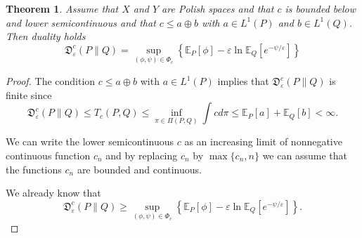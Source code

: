 \documentclass{amsart}
\newtheorem{theorem}{Theorem}[section]
\theoremstyle{definition}
\theoremstyle{remark}
\numberwithin{equation}{section}
\begin{document}
\begin{theorem}\label{thm:duality.general}
Assume that $X$ and $Y$ are Polish spaces and that $c$ is bounded below and lower semicontinuous and that $c \le a \oplus b$ with $a \in L^1(P)$ and $b \in L^1(Q)$.  Then duality holds 
\begin{equation}
\mathfrak{D}^c_\varepsilon(P\|Q) = \sup_{(\phi,\psi)\in \Phi_c} \left\{ \mathbb{E}_P[\phi] - \varepsilon\ln \mathbb{E}_Q[e^{-\psi/\varepsilon}] \right\}
\end{equation}
\end{theorem}

\begin{proof} The condition 
$c \le a \oplus b$ with $a \in L^1(P)$ implies that $\mathfrak{D}^c_\varepsilon(P\|Q)$ is finite since 
$$ 
\mathfrak{D}^c_\varepsilon(P\|Q) \le T_c(P,Q)
\le \inf_{\pi \in \Pi(P,Q)} \int c d\pi \le \mathbb{E}_P[a] + \mathbb{E}_Q[b] <\infty .
$$


We can write the lower semicontinuous $c$ as an increasing limit of nonnegative continuous function $c_n$ and by replacing $c_n$ by $\max\{c_n,n\}$ we can assume that the functions $c_n$ are bounded and continuous. 


We already know that
\begin{equation}
\mathfrak{D}^{c}_\varepsilon(P\|Q) \ge \sup_{(\phi,\psi)\in \Phi_{c}} \left\{ \mathbb{E}_P[\phi] - \varepsilon\ln \mathbb{E}_Q[e^{-\psi/\varepsilon}] \right\} .
\end{equation}


\end{proof}
\end{document}
